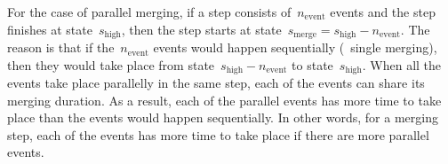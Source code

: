 \documentclass{ica}
\begin{document}
For the case of parallel merging,
if a step consists of~$n_\mathrm{event}$ events and 
the step finishes at state~$s_\mathrm{high}$, then the step starts 
at state~$s_\mathrm{merge}=s_\mathrm{high} - n_\mathrm{event}$.
The reason is that if the~$n_\mathrm{event}$ events 
would happen sequentially (\ie~single merging),
then they would take place 
from state~$s_\mathrm{high} - n_\mathrm{event}$ to state~$s_\mathrm{high}$.
When all the events take place parallelly in the same step, 
each of the events can share its merging duration.
As a result,
each of the parallel events has more time to take place
than the events would happen sequentially.
In other words, for a merging step,
each of the events has more time to take place 
if there are more parallel events.
\end{document}
